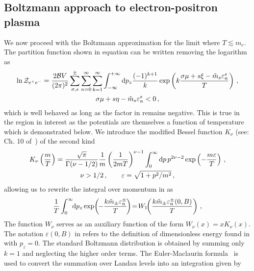 \subsection{Boltzmann approach to electron-positron plasma}
\label{sec:boltzmann}
\noindent We now proceed with the Boltzmann approximation for the limit where $T\lesssim m_e$. The partition function shown in equation  can be written removing the logarithm as
\begin{gather}
 \label{partitionpower}
 \ln{{\cal Z}_{e^{+}e^{-}}}=\frac{2{\cal B}V}{(2\pi)^{2}}\sum_{\sigma,s}^{\pm}\sum_{n=0}^{\infty}\sum_{k=1}^{\infty}\int_{-\infty}^{+\infty}{\rm d}p_{z}
 \frac{(-1)^{k+1}}{k}\exp\left({k\frac{\sigma\mu+s\xi-{\tilde m}_{s}\varepsilon^{s}_{n}}{T}}\right)\,,\\
 \label{bapprox} 
 \sigma\mu+s\eta-{\tilde m}_{s}\varepsilon_{n}^{s}<0\,,
\end{gather}
which is well behaved as long as the factor in  remains negative. This is true in the region in interest as the potentials are themselves a function of temperature which is demonstrated below. We introduce {\color{blue}the modified Bessel function $K_{\nu}$} (see: Ch. 10 of~\cite{Letessier:2002ony}) of the second kind
\begin{gather}
 \label{besselk}
 K_{\nu}\left(\frac{m}{T}\right)=\frac{\sqrt{\pi}}{\Gamma(\nu-1/2)}\frac{1}{m}\left(\frac{1}{2mT}\right)^{\nu-1}
 \int_{0}^{\infty}{\rm d}p\,p^{2\nu-2}\exp\left({-\frac{m\varepsilon}{T}}\right)\,,\\
 \nu>1/2\,,\qquad\varepsilon=\sqrt{1+p^{2}/m^{2}}\,,
\end{gather}
allowing us to rewrite the integral over momentum in  as
\begin{gather}
 \label{besselkint}
 \frac{1}{T}\int_{0}^{\infty}\!\!{\rm d}p_{z}\exp\!\left(\!{-\frac{k{\tilde m}_{\pm}\varepsilon_{n}^{\pm}}{T}}\!\right)\!=\!W_{1}\!\!\left(\frac{k{\tilde m}_{\pm}\varepsilon_{n}^{\pm}(0,B)}{T}\right)\,,
\end{gather}
The function $W_{\nu}$ serves as an auxiliary function of the form $W_{\nu}(x)=xK_{\nu}(x)$. The notation $\varepsilon(0,B)$ in  refers to the definition of dimensionless energy found in  with $p_{z}=0$. The standard Boltzmann distribution is obtained by summing only $k=1$ and neglecting the higher order terms. The Euler-Maclaurin formula~\cite{abramowitz1988handbook} is used to convert the summation over Landau levels into an integration given by
